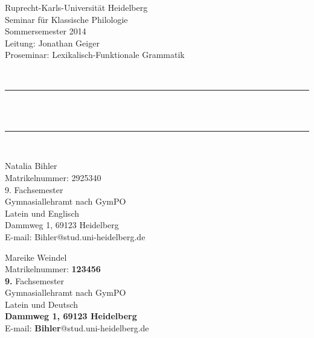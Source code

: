 \begin{titlepage}

\begin{center}


\begin{minipage}{0.55\textwidth}
\begin{flushleft} \small
Ruprecht-Karls-Universität Heidelberg\\
Seminar für Klassische Philologie\\
Sommersemester 2014\\
Leitung: Jonathan Geiger\\ 
Proseminar: Lexikalisch-Funktionale Grammatik
\end{flushleft}
\end{minipage}
\begin{minipage}{0.4\textwidth}
\begin{flushright} \large

\end{flushright}
\end{minipage}
\\[4cm]
\rule{\textwidth}{0.4pt}\\[0.4cm]


 \\[0.1cm]

\rule{\textwidth}{0.4pt}\\[4cm]

\begin{minipage}{0.48\textwidth}
\begin{flushleft} \small
Natalia Bihler\\
Matrikelnummer: 2925340\\
9. Fachsemester\\
Gymnasiallehramt nach GymPO\\
Latein und Englisch\\
Dammweg 1, 69123 Heidelberg\\
E-mail: Bihler@stud.uni-heidelberg.de
\end{flushleft}
\end{minipage}
\begin{minipage}{0.48\textwidth}
\begin{flushright} \small
Mareike Weindel\\
Matrikelnummer: \textbf{123456}\\
\textbf{9. }Fachsemester\\
Gymnasiallehramt nach GymPO\\
Latein und Deutsch\\
\textbf{Dammweg 1, 69123 Heidelberg}\\
E-mail: \textbf{Bihler}@stud.uni-heidelberg.de
\end{flushright}
\end{minipage}


\end{center}
\end{titlepage}

